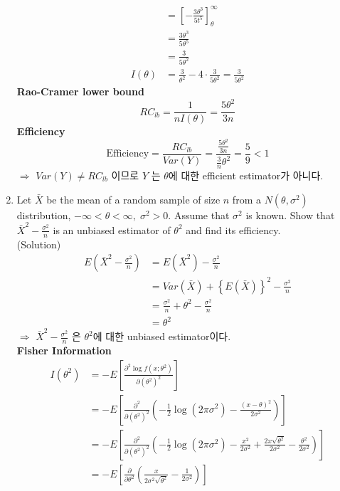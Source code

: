 \documentclass{oblivoir}
\newcommand{\flr}[1]{\left ( #1 \right )}
\newcommand{\slr}[1]{\left \{ #1 \right \}}
\newcommand{\tlr}[1]{\left [ #1 \right]}
\newcommand{\blue}[1]{{\color{blue} #1}}
\begin{document}
\begin{enumerate}
\begin{align*}
&= \tlr{- \frac{3\theta^3}{5t^5}}_{\theta}^{\infty} \\
&= \frac{3\theta^3}{5\theta^5} \\
&= \frac{3}{5\theta^2} \\
I(\theta) &= \frac{3}{\theta^2} - 4 \cdot \frac{3}{5\theta^2} = \frac{3}{5\theta^2}
\end{align*}
\textbf{Rao-Cramer lower bound} 
$$
RC_{lb} = \frac{1}{nI(\theta)} = \frac{5\theta^2}{3n}
$$
\textbf{Efficiency}
$$
\mbox{Efficiency} = \frac{RC_{lb}}{Var(Y)} = \frac{\frac{5\theta^2}{3n}}{\frac{3}{n} \theta^2} = \frac{5}{9} < 1
$$
$\Rightarrow$ $Var(Y) \ne RC_{lb} $ 이므로 $Y$ 는 $\theta$에 대한 efficient estimator가 아니다.\\
\vspace{5mm}
\item 
Let $\bar{X}$ be the mean of a random  sample of size $n$ from a $N(\theta, \sigma^2)$ distribution,
$-\infty < \theta < \infty, \; \sigma^2 > 0$. Assume that $\sigma^2$ is known. Show that $\bar{X}^2 - \frac{\sigma^2}{n}$
is an unbiased estimator of $\theta^2$ and find its efficiency. \\
\blue{(Solution)}
\begin{align*}
E\flr{\bar{X}^2 - \frac{\sigma^2}{n}} &= E(\bar{X}^2) - \frac{\sigma^2}{n} \\
&= Var(\bar{X}) + \slr{E(\bar{X})}^2 - \frac{\sigma^2}{n} \\
&= \frac{\sigma^2}{n} + \theta^2 - \frac{\sigma^2}{n} \\
&= \theta^2
\end{align*}
$\Rightarrow$ $\bar{X}^2 - \frac{\sigma^2}{n}$ 은 $\theta^2$에 대한 unbiased estimator이다.\\
\textbf{Fisher Information}
\begin{align*}
I(\theta^2) &= -E\tlr{\frac{\partial^2 \log f(x;\theta^2)}{\partial (\theta^2)^2}}  \\
&= -E\tlr{\frac{\partial^2}{\partial(\theta^2)^2} \flr{-\frac{1}{2} \log(2\pi\sigma^2) - \frac{(x-\theta)^2}{2\sigma^2}}} \\
&= -E\tlr{\frac{\partial^2}{\partial(\theta^2)^2} \flr{-\frac{1}{2} \log(2\pi\sigma^2) - \frac{x^2}{2\sigma^2} + \frac{2x\sqrt{\theta^2}}{2\sigma^2} - \frac{\theta^2}{2\sigma^2}}} \\
&= -E\tlr{\frac{\partial}{\partial\theta^2} \flr{\frac{x}{2\sigma^2\sqrt{\theta^2}} - \frac{1}{2\sigma^2}}} \\

\end{align*}
\end{enumerate}
\end{document}
